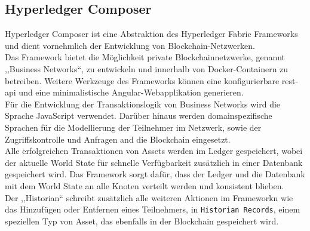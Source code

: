 \subsection{Hyperledger Composer}
\label{sec:prototype_composer}
        Hyperledger Composer\cite{ComposerDocs} ist eine Abstraktion des Hyperledger Fabric Frameworks und dient vornehmlich der Entwicklung von Blockchain-Netzwerken. 
        \medskip\\
        Das Framework bietet die Möglichkeit private Blockchainnetzwerke, genannt ,,Business Networks``, zu entwickeln und innerhalb von Docker-Containern zu betreiben.
        Weitere Werkzeuge des Frameworks können eine konfigurierbare \gls{rest}-\gls{api} und eine minimalistische Angular-Webapplikation generieren.
        \medskip\\
        Für die Entwicklung der Transaktionslogik von Business Networks wird die Sprache JavaScript verwendet. 
        Darüber hinaus werden domainspezifische Sprachen für die Modellierung der Teilnehmer im Netzwerk, sowie der Zugriffskontrolle und Anfragen and die Blockchain eingesetzt.
        \medskip\\
        Alle erfolgreichen Transaktionen von Assets werden im Ledger gespeichert, wobei der aktuelle World State für schnelle Verfügbarkeit zusätzlich in einer Datenbank gespeichert wird. 
        Das Framework sorgt dafür, dass der Ledger und die Datenbank mit dem World State an alle Knoten verteilt werden und konsistent blieben.
        \medskip\\
        Der ,,Historian`` schreibt zusätzlich alle weiteren Aktionen im Frameworkn wie das Hinzufügen oder Entfernen eines Teilnehmers, in \colorbox{light-gray}{\lstinline{Historian Records}}, einem speziellen Typ von Asset, das ebenfalls in der Blockchain gespeichert wird.
        
